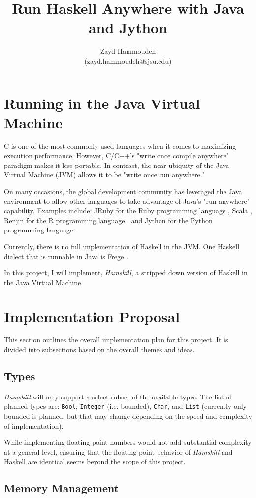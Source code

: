 \documentclass{article}
\title{Run Haskell Anywhere with Java and Jython}
\author{
  Zayd Hammoudeh\\
  (zayd.hammoudeh@sjsu.edu)
  }
\begin{document}
\maketitle

\section{Running in the Java Virtual Machine}

C is one of the most commonly used languages when it comes to maximizing execution performance.  However, C/C++'s "write once compile anywhere" paradigm makes it less portable.  In contrast, the near ubiquity of the Java Virtual Machine (JVM) allows it to be "write once run anywhere."  

On many occasions, the global development community has leveraged the Java environment to allow other languages to take advantage of Java's "run anywhere" capability.  Examples include: JRuby for the Ruby programming language \cite{jruby}, Scala \cite{scala}, Renjin for the R programming language \cite{renjin}, and Jython for the Python programming language \cite{jython_jvm}.

Currently, there is no full implementation of Haskell in the JVM.  One Haskell dialect that is runnable in Java is Frege \cite{frege}.  

In this project, I will implement, \emph{Hamskill}, a stripped down version of Haskell in the Java Virtual Machine.  

\section{Implementation Proposal}

This section outlines the overall implementation plan for this project.  It is divided into subsections based on the overall themes and ideas.  

\subsection{Types}

\emph{Hamskill} will only support a select subset of the available types.  The list of planned types are: {\tt Bool}, {\tt Integer} (i.e. bounded), {\tt Char}, and {\tt List} (currently only bounded is planned, but that may change depending on the speed and complexity of implementation).

While implementing floating point numbers would not add substantial complexity at a general level, ensuring that the floating point behavior of \emph{Hamskill} and Haskell are identical seems beyond the scope of this project.

\subsection{Memory Management}
 


%


\end{document}

